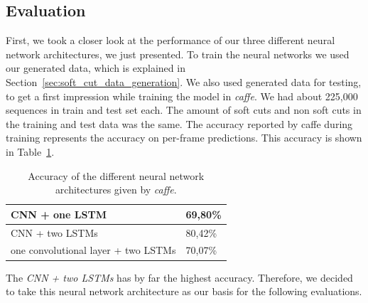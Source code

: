 \subsection{Evaluation}
\label{sec:soft_cut_evaluation}

First, we took a closer look at the performance of our three different neural network architectures, we just presented.
To train the neural networks we used our generated data, which is explained in Section~\ref{sec:soft_cut_data_generation}.
We also used generated data for testing, to get a first impression while training the model in \textit{caffe}.
We had about 225,000 sequences in train and test set each.
The amount of soft cuts and non soft cuts in the training and test data was the same.
The accuracy reported by caffe during training represents the accuracy on per-frame predictions.
This accuracy is shown in Table~\ref{tab:caffe_accuracy}.
\begin{table}[ht]
	\centering
	\begin{tabular}{l|l}
	CNN + one LSTM                      & 69,80\% \\ \hline
	CNN + two LSTMs                     & 80,42\% \\ \hline
	one convolutional layer + two LSTMs & 70,07\% \\
	\end{tabular}
	\caption{Accuracy of the different neural network architectures given by \textit{caffe}.}
	\label{tab:caffe_accuracy}
\end{table}
The \textit{CNN + two LSTMs} has by far the highest accuracy.
Therefore, we decided to take this neural network architecture as our basis for the following evaluations.

